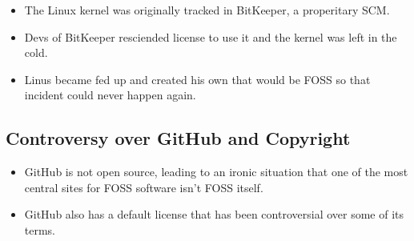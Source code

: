 \begin{itemize}
\itemsep1pt\parskip0pt
\item
  The Linux kernel was originally tracked in BitKeeper, a properitary
  SCM.
\item
  Devs of BitKeeper resciended license to use it and the kernel was left
  in the cold.
\item
  Linus became fed up and created his own that would be FOSS so that
  incident could never happen again.
\end{itemize}

\subsection{Controversy over GitHub and
Copyright}\label{controversy-over-github-and-copyright}

\begin{itemize}
\itemsep1pt\parskip0pt
\item
  GitHub is not open source, leading to an ironic situation that one of
  the most central sites for FOSS software isn't FOSS itself.
\item
  GitHub also has a default license that has been controversial over
  some of its terms.
\end{itemize}
